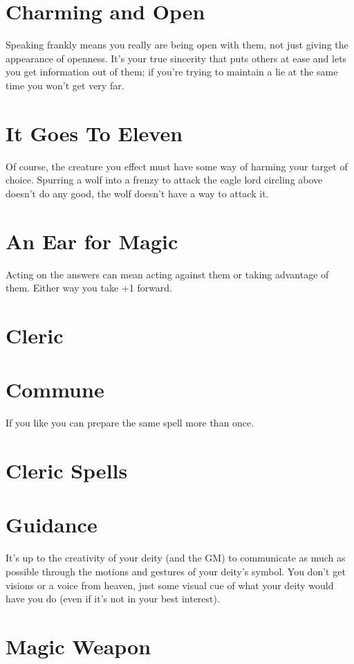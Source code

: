 \section{Charming and Open}


 Speaking frankly means you really are being open with them, not just giving the appearance of openness. It's your true sincerity that puts others at ease and lets you get information out of them; if you're trying to maintain a lie at the same time you won't get very far.
\section{It Goes To Eleven}


 Of course, the creature you effect must have some way of harming your target of choice. Spurring a wolf into a frenzy to attack the eagle lord circling above doesn't do any good, the wolf doesn't have a way to attack it.
\section{An Ear for Magic}


 Acting on the answers can mean acting against them or taking advantage of them. Either way you take +1 forward.
\section{Cleric}
\section{Commune}


 If you like you can prepare the same spell more than once.
\section{Cleric Spells}
\section{Guidance}


 It's up to the creativity of your deity (and the GM) to communicate as much as possible through the motions and gestures of your deity's symbol. You don't get visions or a voice from heaven, just some visual cue of what your deity would have you do (even if it's not in your best interest).
\section{Magic Weapon}


